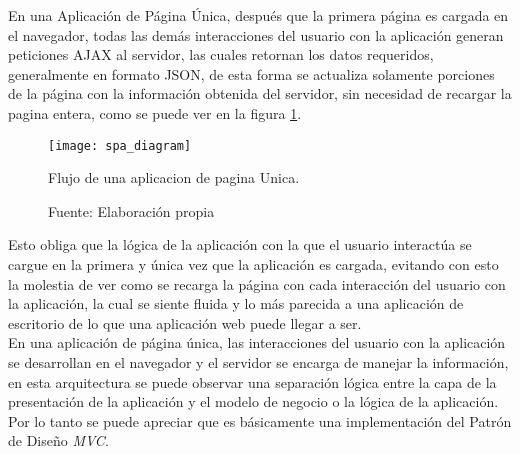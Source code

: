 En una Aplicación de Página Única, después que la primera página es cargada en el navegador, todas las demás interacciones del usuario con la aplicación generan peticiones AJAX al servidor, las cuales retornan los datos requeridos, generalmente en formato JSON, de esta forma se actualiza solamente porciones de la página con la información obtenida del servidor, sin necesidad de recargar la pagina entera, como se puede ver en la figura \ref{fig:spa_diagram}. \\


\begin{figure}[H]
  \begin{center}
    \texttt{[image: spa\_diagram]}
    \caption{Flujo de una aplicacion de pagina Unica.}
    \label{fig:spa_diagram}
    \caption*{Fuente: Elaboración propia}
  \end{center}
\end{figure}


Esto obliga que la lógica de la aplicación con la que el usuario interactúa se cargue en la primera y única vez que la aplicación es cargada, evitando con esto la molestia de ver como se recarga la página con cada interacción del usuario con la aplicación, la cual se siente fluida y lo más parecida a una aplicación de escritorio de lo que una aplicación web puede llegar a ser.\\




%

En una aplicación de página única, las interacciones del usuario con la aplicación se desarrollan en el navegador y el servidor se encarga de manejar la información, en esta arquitectura se puede observar una separación lógica entre la capa de la presentación de la aplicación y el modelo de negocio o la lógica de la aplicación. Por lo tanto se puede apreciar que es básicamente una implementación del Patrón de Diseño \emph{MVC}.\\


